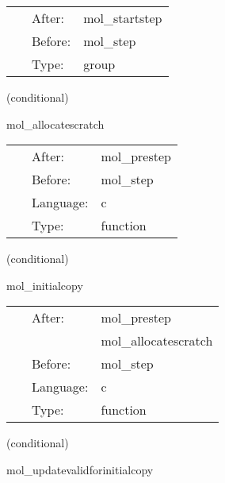  \begin{tabular*}{160mm}{cll} 
~ & After:  & mol\_startstep \\ 
~ & Before:  & mol\_step \\ 
~ & Type:  & group \\ 
\end{tabular*} 


\vspace{5mm}

   (conditional) 

\hspace{5mm} mol\_allocatescratch 

\hspace{5mm}{\it allocate sufficient space for array scratch variables } 


\hspace{5mm}

 \begin{tabular*}{160mm}{cll} 
~ & After:  & mol\_prestep \\ 
~ & Before:  & mol\_step \\ 
~ & Language:  & c \\ 
~ & Type:  & function \\ 
\end{tabular*} 


\vspace{5mm}

   (conditional) 

\hspace{5mm} mol\_initialcopy 

\hspace{5mm}{\it ensure the data is in the correct timelevel } 


\hspace{5mm}

 \begin{tabular*}{160mm}{cll} 
~ & After:  & mol\_prestep \\ 
~& ~ &mol\_allocatescratch\\ 
~ & Before:  & mol\_step \\ 
~ & Language:  & c \\ 
~ & Type:  & function \\ 
\end{tabular*} 


\vspace{5mm}

   (conditional) 

\hspace{5mm} mol\_updatevalidforinitialcopy 

